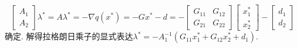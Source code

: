 \documentclass{SBCbookchapter}
\begin{document}
\begin{equation}
\label{eq:quadratic-programming-eq-lambda}
\begin{bmatrix} A_1 \\ A_2 \end{bmatrix} \lambda^* = A \lambda^* = -\nabla q(x^*) = - G x^* - d = - \begin{bmatrix} G_{11} & G_{12} \\ G_{21} & G_{22} \end{bmatrix} \begin{bmatrix} x_1^* \\ x_2^* \end{bmatrix} - \begin{bmatrix} d_1 \\ d_2 \end{bmatrix}
\end{equation}
确定. 解得拉格朗日乘子的显式表达$\lambda^* = -A_1^{-1} \left( G_{11}x_1^* + G_{12}x_2^* + d_1 \right).$
\end{document}

